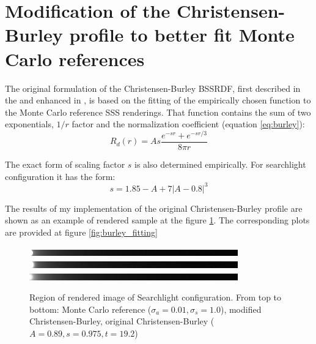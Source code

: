 \section{Modification of the Christensen-Burley profile to better fit Monte
Carlo references}

The original formulation of the Christensen-Burley BSSRDF, first described in the
\cite{Burley:disney_siggraph15} and enhanced in \cite{Christensen:2015:ARP:2775280.2792555}, is
based on the fitting of the empirically chosen function to the Monte Carlo reference SSS renderings.
That function contains the sum of two exponentials, $1/r$ factor and the normalization coefficient
(equation \ref{eq:burley}):
\[ R_d(r) = As\dfrac{e^{-sr}+e^{-sr/3}}{8\pi r} \]

The exact form of scaling factor $s$ is also determined empirically. For searchlight configuration 
it has the form:
\begin{equation}
\label{eq:cb_scaling}
s=1.85-A + 7|A - 0.8|^3
\end{equation}

The results of my implementation of the original Christensen-Burley profile are shown as an example
of rendered sample at the figure \ref{fig:burley_searchlight_renders}. The corresponding plots are
provided at figure \ref{fig:burley_fitting}

\begin{figure}[h]
    \centering
    \includegraphics[width=256pt,trim={0 0 256 0},clip]{imgs/renders/cb_montecarlo_slice}
    \includegraphics[width=256pt,trim={0 0 256 0},clip]{imgs/renders/cb_modified_slice}
    \includegraphics[width=256pt,trim={0 0 256 0},clip]{imgs/renders/cb_original_slice}
    \caption{Region of rendered image of Searchlight configuration. From top to bottom: Monte Carlo
    reference ($\sigma_a=0.01, \sigma_s=1.0$), modified Christensen-Burley, original
    Christensen-Burley ($A=0.89, s=0.975, t=19.2$)}
    \label{fig:burley_searchlight_renders}
\end{figure}

